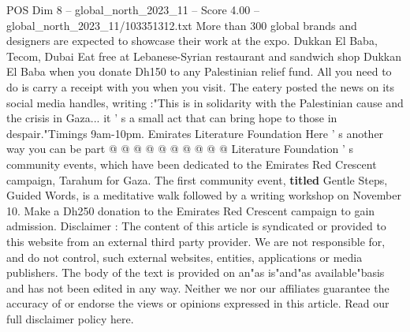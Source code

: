 \begin{textsample}{POS Dim 8 – global\_north\_2023\_11 – Score 4.00 – global\_north\_2023\_11/103351312.txt}
More than 300 global brands and designers are expected to showcase their work at the expo.
Dukkan El Baba, Tecom, Dubai Eat free at Lebanese-Syrian restaurant and sandwich shop Dukkan El Baba when you donate Dh150 to any Palestinian relief fund.
All you need to do is carry a receipt with you when you visit.
The eatery posted the news on its social media handles, writing :"This is in solidarity with the Palestinian cause and the crisis in Gaza... it ' s a small act that can bring hope to those in despair."Timings 9am-10pm.
Emirates Literature Foundation Here ' s another way you can be part @ @ @ @ @ @ @ @ @ @ Literature Foundation ' s community events, which have been dedicated to the Emirates Red Crescent campaign, Tarahum for Gaza.
The first community event, \textbf{titled} Gentle Steps, Guided Words, is a meditative walk followed by a writing workshop on November 10.
Make a Dh250 donation to the Emirates Red Crescent campaign to gain admission.
Disclaimer : The content of this article is syndicated or provided to this website from an external third party provider.
We are not responsible for, and do not control, such external websites, entities, applications or media publishers.
The body of the text is provided on an"as is"and"as available"basis and has not been edited in any way.
Neither we nor our affiliates guarantee the accuracy of or endorse the views or opinions expressed in this article.
Read our full disclaimer policy here.

\end{textsample}
